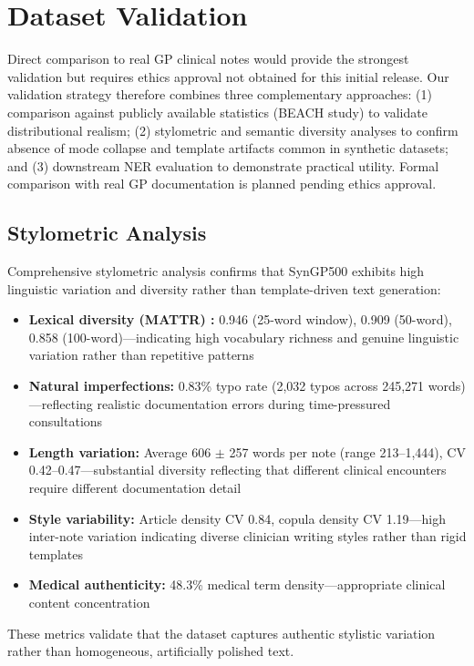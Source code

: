 \documentclass[11pt]{article}
\begin{document}
\section{Dataset Validation}

Direct comparison to real GP clinical notes would provide the strongest validation but requires ethics approval not obtained for this initial release. Our validation strategy therefore combines three complementary approaches: (1) comparison against publicly available statistics (BEACH study) to validate distributional realism; (2) stylometric and semantic diversity analyses to confirm absence of mode collapse and template artifacts common in synthetic datasets; and (3) downstream NER evaluation to demonstrate practical utility. Formal comparison with real GP documentation is planned pending ethics approval.

\subsection{Stylometric Analysis}

Comprehensive stylometric analysis confirms that SynGP500 exhibits high linguistic variation and diversity rather than template-driven text generation:

\begin{itemize}[noitemsep]
    \item \textbf{Lexical diversity (MATTR) \cite{covington2010}:} 0.946 (25-word window), 0.909 (50-word), 0.858 (100-word)—indicating high vocabulary richness and genuine linguistic variation rather than repetitive patterns
    \item \textbf{Natural imperfections:} 0.83\% typo rate (2,032 typos across 245,271 words)—reflecting realistic documentation errors during time-pressured consultations
    \item \textbf{Length variation:} Average 606 $\pm$ 257 words per note (range 213--1,444), CV 0.42--0.47—substantial diversity reflecting that different clinical encounters require different documentation detail
    \item \textbf{Style variability:} Article density CV 0.84, copula density CV 1.19—high inter-note variation indicating diverse clinician writing styles rather than rigid templates
    \item \textbf{Medical authenticity:} 48.3\% medical term density—appropriate clinical content concentration
\end{itemize}

These metrics validate that the dataset captures authentic stylistic variation rather than homogeneous, artificially polished text.
\end{document}

